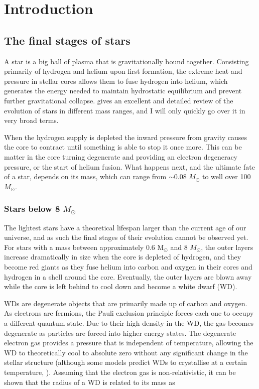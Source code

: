\documentclass[a4paper,oneside,12pt, class=Latex/Classes/PhDthesisPSnPDF, crop=false]{standalone}
\begin{document}
\doublespacing
\chapter{Introduction}
\label{chap:intro}

\section{The final stages of stars}
A star is a big ball of plasma that is gravitationally bound together. Consisting primarily of hydrogen and helium upon first formation, the extreme heat and pressure in stellar cores allows them to fuse hydrogen into helium, which generates the energy needed to maintain hydrostatic equilibrium and prevent further gravitational collapse. \citet{starstruct} gives an excellent and detailed review of the evolution of stars in different mass ranges, and I will only quickly go over it in very broad terms.

When the hydrogen supply is depleted the inward pressure from gravity causes the core to contract until something is able to stop it once more. This can be matter in the core turning degenerate and providing an electron degeneracy pressure, or the start of helium fusion. What happens next, and the ultimate fate of a star, depends on its mass, which can range from $\sim0.08$ $M_\odot$ to well over 100 $M_\odot$.


\subsection{Stars below 8 $M_\odot$}
\label{interm_mass_stars}
The lightest stars have a theoretical lifespan larger than the current age of our universe, and as such the final stages of their evolution cannot be observed yet. For stars with a mass between approximately 0.6 M$_\odot$ and 8 $M_\odot$, the outer layers increase dramatically in size when the core is depleted of hydrogen, and they become red giants as they fuse helium into carbon and oxygen in their cores and hydrogen in a shell around the core. Eventually, the outer layers are blown away while the core is left behind to cool down and become a white dwarf (WD).

WDs are degenerate objects that are primarily made up of carbon and oxygen. As electrons are fermions, the Pauli exclusion principle \citep{Pauli} forces each one to occupy a different quantum state. Due to their high density in the WD, the gas becomes degenerate as particles are forced into higher energy states. The degenerate electron gas provides a pressure that is independent of temperature, allowing the WD to theoretically cool to absolute zero without any significant change in the stellar structure (although some models predict WDs to crystallise at a certain temperature, \citealt{WD_crystal_Mochkovitch, WD_crystal_Isern}). Assuming that the electron gas is non-relativistic, it can be shown that the radius of a WD is related to its mass as
\end{document}
